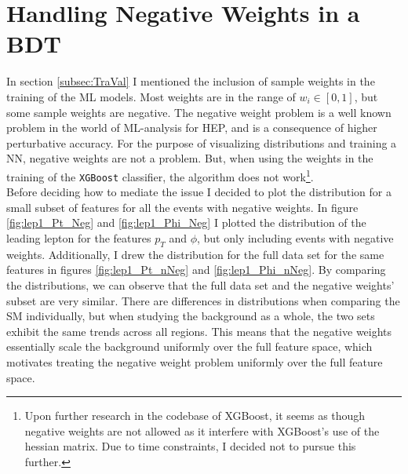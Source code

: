 \section{Handling Negative Weights in a BDT}\label{subsec:negWeights}
In section \ref{subsec:TraVal} I mentioned the inclusion of sample weights in the training 
of the \ac{ML} models. Most weights are in the range of $w_i \in [0,1]$, but some sample weights are negative.
The negative weight problem is a well known problem in the world of \ac{ML}-analysis for \ac{HEP}, 
and is a consequence of higher perturbative accuracy. For the purpose of visualizing 
distributions and training a \ac{NN}, negative weights are not a problem. But, when using 
the weights in the training of the \verb!XGBoost! classifier, the algorithm does not work\footnote{Upon further research 
in the codebase of XGBoost, it seems as though negative weights are not allowed as it interfere with XGBoost's use 
of the hessian matrix. Due to time constraints, I decided not to  pursue this further.}.  
\\
Before deciding how to mediate the issue I decided to plot the distribution for 
a small subset of features for all the events with negative weights.
In figure \ref{fig:lep1_Pt_Neg} and \ref{fig:lep1_Phi_Neg} I plotted the distribution of the leading 
lepton for the features $p_T$ and $\phi$, but only including events with negative weights.
Additionally, I drew the distribution for the full data set for the same features in figures \ref{fig:lep1_Pt_nNeg}
and \ref{fig:lep1_Phi_nNeg}. By comparing the distributions, we can observe that the full data set and the 
negative weights' subset are very similar. There are differences in distributions when comparing the \ac{SM} 
individually, but when studying the background as a whole, the two sets exhibit the same trends across all 
regions. This means that the negative weights essentially scale the background uniformly over the full feature 
space, which motivates treating the negative weight problem uniformly over the full feature space.
